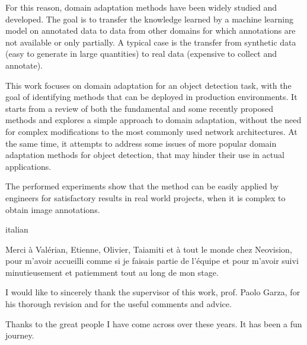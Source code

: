 \documentclass[%
    corpo=12pt,
    twoside,
    stile=classica,   
    tipotesi=magistrale,
    evenboxes,
    english,
	numerazioneromana,
]{toptesi}
\begin{document}
For this reason, domain adaptation methods have been widely studied and developed. The goal is to transfer the knowledge learned by a machine learning model on annotated data to data from other domains for which annotations are not available or only partially. A typical case is the transfer from synthetic data (easy to generate in large quantities) to real data (expensive to collect and annotate).

\bigskip
This work focuses on domain adaptation for an object detection task, with the goal of identifying methods that can be deployed in production environments. It starts from a review of both the fundamental and some recently proposed methods and explores a simple approach to domain adaptation, without the need for complex modifications to the most commonly used network architectures. At the same time, it attempts to address some issues of more popular domain adaptation methods for object detection, that may hinder their use in actual applications.

The performed experiments show that the method can be easily applied by engineers for satisfactory results in real world projects, when it is complex to obtain image annotations.

\paginavuota %

\ringraziamenti
\begin{otherlanguage*}{italian}
\end{otherlanguage*}

\vspace*{1cm}

\bigskip
\foreignlanguage{french}{Merci à Valérian, Etienne, Olivier, Taiamiti et à tout le monde chez Neovision, pour m'avoir accueilli comme si je faisais partie de l'équipe et pour m'avoir suivi minutieusement et patiemment tout au long de mon stage.}

\bigskip
I would like to sincerely thank the supervisor of this work, prof. Paolo Garza, for his thorough revision and for the useful comments and advice.

\bigskip
Thanks to the great people I have come across over these years. It has been a fun journey.

\paginavuota
\end{document}
